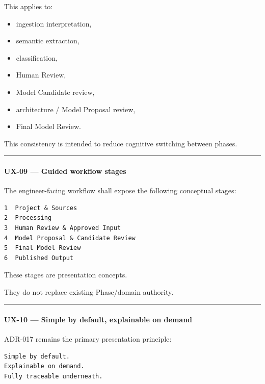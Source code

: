 This applies to:

\begin{itemize}
\tightlist
\item
  ingestion interpretation,
\item
  semantic extraction,
\item
  classification,
\item
  Human Review,
\item
  Model Candidate review,
\item
  architecture / Model Proposal review,
\item
  Final Model Review.
\end{itemize}

This consistency is intended to reduce cognitive switching between phases.

\begin{center}\rule{0.5\linewidth}{0.5pt}\end{center}

\hypertarget{ux-09--guided-workflow-stages}{%
\paragraph{UX-09 --- Guided workflow stages}\label{ux-09--guided-workflow-stages}}

The engineer-facing workflow shall expose the following conceptual stages:

\begin{verbatim}
1  Project & Sources
2  Processing
3  Human Review & Approved Input
4  Model Proposal & Candidate Review
5  Final Model Review
6  Published Output
\end{verbatim}

These stages are presentation concepts.

They do not replace existing Phase/domain authority.

\begin{center}\rule{0.5\linewidth}{0.5pt}\end{center}

\hypertarget{ux-10--simple-by-default-explainable-on-demand}{%
\paragraph{UX-10 --- Simple by default, explainable on demand}\label{ux-10--simple-by-default-explainable-on-demand}}

ADR-017 remains the primary presentation principle:

\begin{verbatim}
Simple by default.
Explainable on demand.
Fully traceable underneath.
\end{verbatim}

